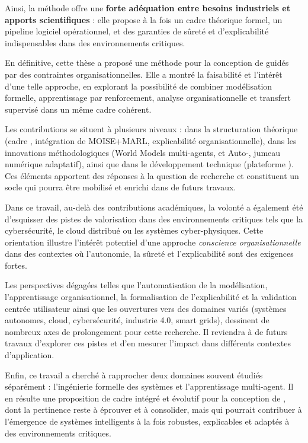 \medskip
\noindent
Ainsi, la méthode  offre une \textbf{forte adéquation entre besoins industriels et apports scientifiques} :
elle propose à la fois un cadre théorique formel, un pipeline logiciel opérationnel, et des garanties de sûreté et d'explicabilité indispensables dans des environnements critiques.

\bigskip
\noindent
\medskip
\noindent
En définitive, cette thèse a proposé une méthode pour la conception de  guidés par des contraintes organisationnelles.
Elle a montré la faisabilité et l’intérêt d’une telle approche, en explorant la possibilité de combiner modélisation formelle, apprentissage par renforcement, analyse organisationnelle et transfert supervisé dans un même cadre cohérent.

\medskip
\noindent
Les contributions se situent à plusieurs niveaux : dans la structuration théorique (cadre , intégration de MOISE+MARL, explicabilité organisationnelle), dans les innovations méthodologiques (World Models multi-agents,  et Auto-, jumeau numérique adaptatif), ainsi que dans le développement technique (plateforme ).
Ces éléments apportent des réponses à la question de recherche et constituent un socle qui pourra être mobilisé et enrichi dans de futurs travaux.

\medskip
\noindent
Dans ce travail, au-delà des contributions académiques, la volonté a également été d’esquisser des pistes de valorisation dans des environnements critiques tels que la cybersécurité, le cloud distribué ou les systèmes cyber-physiques.
Cette orientation illustre l’intérêt potentiel d’une approche \textit{conscience organisationnelle} dans des contextes où l’autonomie, la sûreté et l’explicabilité sont des exigences fortes.

\medskip
\noindent
Les perspectives dégagées telles que l’automatisation de la modélisation, l'apprentissage organisationnel, la formalisation de l’explicabilité et la validation centrée utilisateur ainsi que les ouvertures vers des domaines variés (systèmes autonomes, cloud, cybersécurité, industrie 4.0, smart grids), dessinent de nombreux axes de prolongement pour cette recherche.
Il reviendra à de futurs travaux d’explorer ces pistes et d’en mesurer l’impact dans différents contextes d’application.

\medskip
\noindent
Enfin, ce travail a cherché à rapprocher deux domaines souvent étudiés séparément : l’ingénierie formelle des systèmes et l’apprentissage multi-agent.
Il en résulte une proposition de cadre intégré et évolutif pour la conception de , dont la pertinence reste à éprouver et à consolider, mais qui pourrait contribuer à l’émergence de systèmes intelligents à la fois robustes, explicables et adaptés à des environnements critiques.


\clearpage
\thispagestyle{empty}
\null
\newpage
